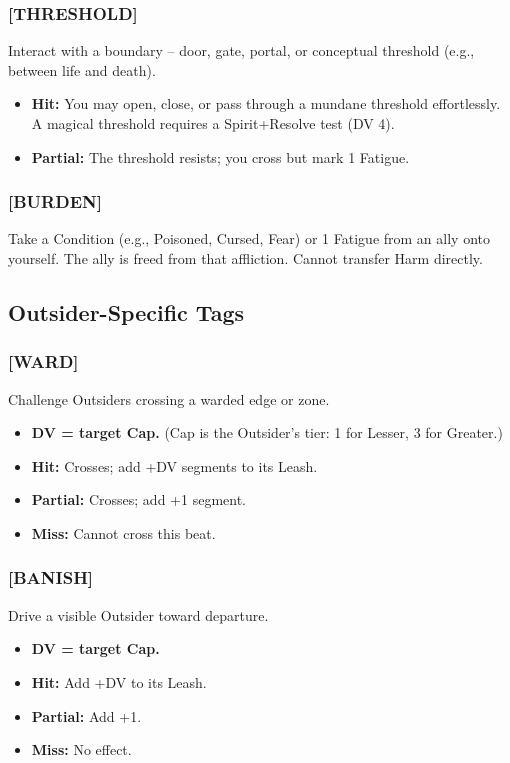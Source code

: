 \subsubsection{[THRESHOLD]}
Interact with a boundary -- door, gate, portal, or conceptual threshold (e.g., between life and death).
\begin{itemize}
  \item \textbf{Hit:} You may open, close, or pass through a mundane threshold effortlessly. A magical threshold requires a Spirit+Resolve test (DV 4).
  \item \textbf{Partial:} The threshold resists; you cross but mark 1 Fatigue.
\end{itemize}

\subsubsection{[BURDEN]}
Take a Condition (e.g., Poisoned, Cursed, Fear) or 1 Fatigue from an ally onto yourself. The ally is freed from that affliction. Cannot transfer Harm directly.

\subsection{Outsider-Specific Tags}

\subsubsection{[WARD]}
Challenge Outsiders crossing a warded edge or zone.
\begin{itemize}
  \item \textbf{DV = target Cap.} (Cap is the Outsider's tier: 1 for Lesser, 3 for Greater.)
  \item \textbf{Hit:} Crosses; add +DV segments to its Leash.
  \item \textbf{Partial:} Crosses; add +1 segment.
  \item \textbf{Miss:} Cannot cross this beat.
\end{itemize}

\subsubsection{[BANISH]}
Drive a visible Outsider toward departure.
\begin{itemize}
  \item \textbf{DV = target Cap.}
  \item \textbf{Hit:} Add +DV to its Leash.
  \item \textbf{Partial:} Add +1.
  \item \textbf{Miss:} No effect.
\end{itemize}

